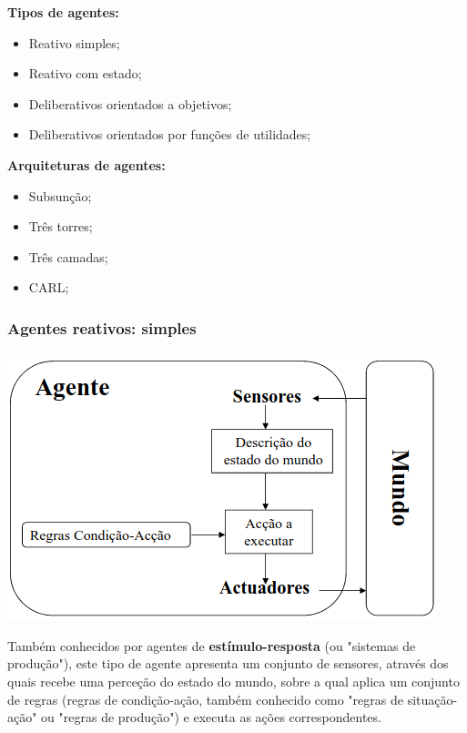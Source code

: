 \documentclass{article}
\begin{document}
\begin{flushleft}
  \textbf{Tipos de agentes:}
  \begin{itemize}
    \item Reativo simples;
    \item Reativo com estado;
    \item Deliberativos orientados a objetivos;
    \item Deliberativos orientados por funções de utilidades;
  \end{itemize}

  \textbf{Arquiteturas de agentes:}
  \begin{itemize}
    \item Subsunção;
    \item Três torres;
    \item Três camadas;
    \item CARL;
  \end{itemize}
\end{flushleft}

\subsubsection{Agentes reativos: simples}

\begin{center}
  \includegraphics[scale=0.4]{9}
\end{center}

Também conhecidos por agentes de \textbf{estímulo-resposta} (ou "sistemas de produção"), este tipo de agente apresenta um
conjunto de sensores, através dos quais recebe uma perceção do estado do mundo, sobre a
qual aplica um conjunto de regras (regras de condição-ação, também conhecido
como "regras de situação-ação" ou "regras de produção") e executa as ações
correspondentes.
\end{document}
